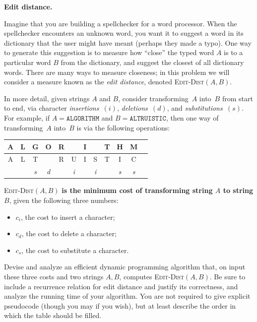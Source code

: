 \documentclass[11pt,addpoints]{exam}
\begin{document}
\begin{questions}
  \question[20]
  \textbf{Edit distance.}
   
    Imagine that you are building a spellchecker for a word processor.
    When the spellchecker encounters an unknown word, you want it to suggest a word in its dictionary that the user might have meant (perhaps they made a typo).
    One way to generate this suggestion is to measure how ``close'' the typed word $A$ is to a particular word $B$ from the dictionary, and suggest the closest of all dictionary words.
    There are many ways to measure closeness; in this problem we will consider a measure known as the \textit{edit distance}, denoted \textsc{Edit-Dist}$(A, B)$.
    
    In more detail, given strings $A$ and $B$, consider transforming~$A$ into~$B$ from start to end, via character \textit{insertions~$(i)$}, \textit{deletions~$(d)$}, and \textit{substitutions~$(s)$}.
    For example, if $A = \mathtt{ALGORITHM}$ and $B = \mathtt{ALTRUISTIC}$, then one way of transforming~$A$ into~$B$ is via the following operations:
    \begin{center}
    \begin{tabular}{|c|c|c|c|c|c|c|c|c|c|c|c|} 
    \hline
    A & L & G & O & R &  & I & & T & H & M \\ 
    \hline
    A & L & T &  & R & U & I & S & T & I & C\\ 
    \hline
    &  & \textit{s} & \textit{d} & & \textit{i} & & \textit{i} & & \textit{s} & \textit{s}\\
    \hline
    \end{tabular}
    \end{center}
    \textsc{Edit-Dist}$(A, B)$ \textbf{is the minimum cost of transforming string $A$ to string $B$}, given the following three numbers:
    \begin{itemize}
    \item $c_i$, the cost to insert a character;
    \item $c_d$, the cost to delete a character;
    \item $c_s$, the cost to substitute a character.
    \end{itemize}
    
    Devise and analyze an efficient dynamic programming algorithm that, on input these three costs and two strings $A, B$, computes \textsc{Edit-Dist}$(A,B)$.
    Be sure to include a recurrence relation for edit distance and justify its correctness, and analyze the running time of your algorithm.
    You are not required to give explicit pseudocode (though you may if you wish), but at least describe the order in which the table should be filled.
    

\end{questions}
\end{document}

